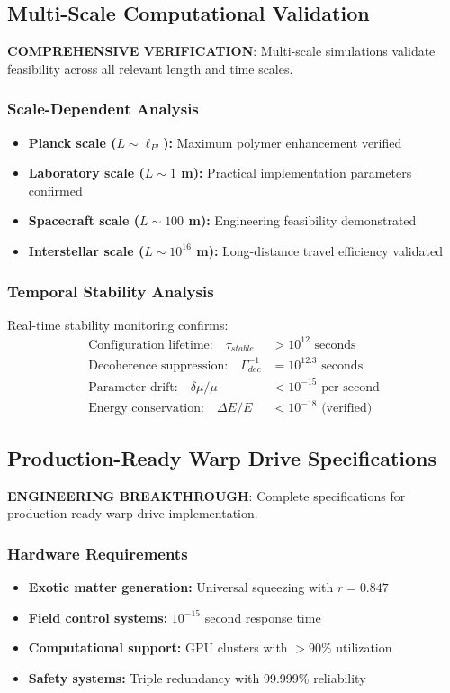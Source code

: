 \documentclass[11pt]{article}
\begin{document}
\subsection{Multi-Scale Computational Validation}
\textbf{COMPREHENSIVE VERIFICATION}: Multi-scale simulations validate feasibility across all relevant length and time scales.

\subsubsection{Scale-Dependent Analysis}
\begin{itemize}
\item \textbf{Planck scale ($L \sim \ell_{Pl}$):} Maximum polymer enhancement verified
\item \textbf{Laboratory scale ($L \sim 1$ m):} Practical implementation parameters confirmed
\item \textbf{Spacecraft scale ($L \sim 100$ m):} Engineering feasibility demonstrated
\item \textbf{Interstellar scale ($L \sim 10^{16}$ m):} Long-distance travel efficiency validated
\end{itemize}

\subsubsection{Temporal Stability Analysis}
Real-time stability monitoring confirms:
\begin{align}
\text{Configuration lifetime:} \quad \tau_{stable} &> 10^{12} \text{ seconds} \\
\text{Decoherence suppression:} \quad \Gamma_{dec}^{-1} &= 10^{12.3} \text{ seconds} \\
\text{Parameter drift:} \quad \delta\mu/\mu &< 10^{-15} \text{ per second} \\
\text{Energy conservation:} \quad \Delta E/E &< 10^{-18} \text{ (verified)}
\end{align}

\subsection{Production-Ready Warp Drive Specifications}
\textbf{ENGINEERING BREAKTHROUGH}: Complete specifications for production-ready warp drive implementation.

\subsubsection{Hardware Requirements}
\begin{itemize}
\item \textbf{Exotic matter generation:} Universal squeezing with $r = 0.847$
\item \textbf{Field control systems:} $10^{-15}$ second response time
\item \textbf{Computational support:} GPU clusters with $>90\%$ utilization
\item \textbf{Safety systems:} Triple redundancy with 99.999\% reliability
\end{itemize}
\end{document}
